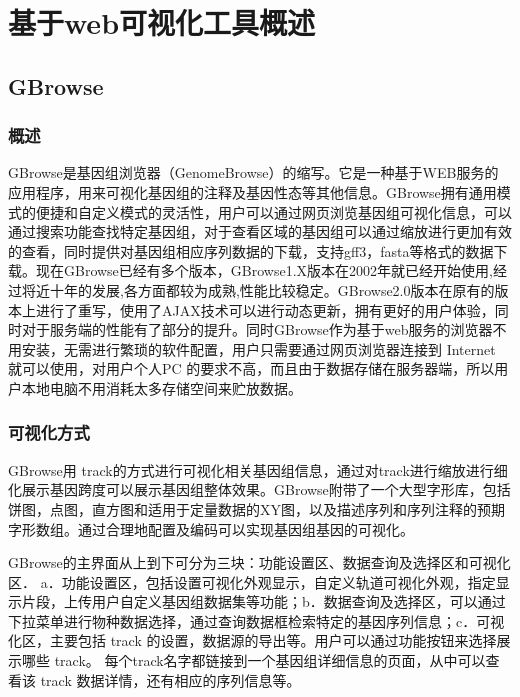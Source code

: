 \chapter{基于web可视化工具概述}
	\section{GBrowse}
		\subsection{概述}
		GBrowse是基因组浏览器（GenomeBrowse）的缩写。它是一种基于WEB服务的应用程序，用来可视化基因组的注释及基因性态等其他信息。GBrowse拥有通用模式的便捷和自定义模式的灵活性，用户可以通过网页浏览基因组可视化信息，可以通过搜索功能查找特定基因组，对于查看区域的基因组可以通过缩放进行更加有效的查看，同时提供对基因组相应序列数据的下载，支持gff3，fasta等格式的数据下载。现在GBrowse已经有多个版本，GBrowse1.X版本在2002年就已经开始使用,经过将近十年的发展,各方面都较为成熟,性能比较稳定。GBrowse2.0版本在原有的版本上进行了重写，使用了AJAX技术可以进行动态更新，拥有更好的用户体验，同时对于服务端的性能有了部分的提升。同时GBrowse作为基于web服务的浏览器不用安装，无需进行繁琐的软件配置，用户只需要通过网页浏览器连接到 Internet 就可以使用，对用户个人PC 的要求不高，而且由于数据存储在服务器端，所以用户本地电脑不用消耗太多存储空间来贮放数据。
		\subsection{可视化方式}
		GBrowse用 track的方式进行可视化相关基因组信息，通过对track进行缩放进行细化展示基因跨度可以展示基因组整体效果。GBrowse附带了一个大型字形库，包括饼图，点图，直方图和适用于定量数据的XY图，以及描述序列和序列注释的预期字形数组。通过合理地配置及编码可以实现基因组基因的可视化。
		
		GBrowse的主界面从上到下可分为三块：功能设置区、数据查询及选择区和可视化区． a．功能设置区，包括设置可视化外观显示，自定义轨道可视化外观，指定显示片段，上传用户自定义基因组数据集等功能；b．数据查询及选择区，可以通过下拉菜单进行物种数据选择，通过查询数据框检索特定的基因序列信息；c．可视化区，主要包括 track 的设置，数据源的导出等。用户可以通过功能按钮来选择展示哪些 track。 每个track名字都链接到一个基因组详细信息的页面，从中可以查看该 track 数据详情，还有相应的序列信息等。
